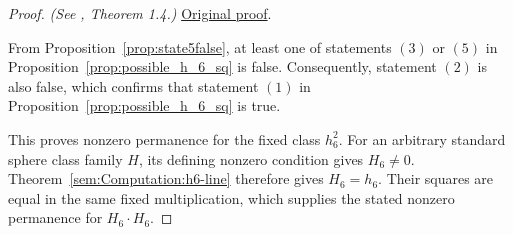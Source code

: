\begin{proof}
\textit{(See \cite{LWX126}, Theorem 1.4.)} \href{paper/main.tex.html#L2212}{Original proof}.

From Proposition~\ref{prop:state5false}, at least one of  statements $(3)$ or $(5)$ in Proposition~\ref{prop:possible_h_6_sq} is false. Consequently,  statement $(2)$ is also false, which confirms that statement $(1)$ in Proposition~\ref{prop:possible_h_6_sq} is true.

This proves nonzero permanence for the fixed class $h_6^2$. For an
arbitrary standard sphere class family $H$, its defining nonzero condition
gives $H_6\ne0$. Theorem~\ref{sem:Computation:h6-line} therefore gives
$H_6=h_6$. Their squares are equal in the same fixed multiplication,
which supplies the stated nonzero permanence for $H_6\cdot H_6$.
\end{proof}

